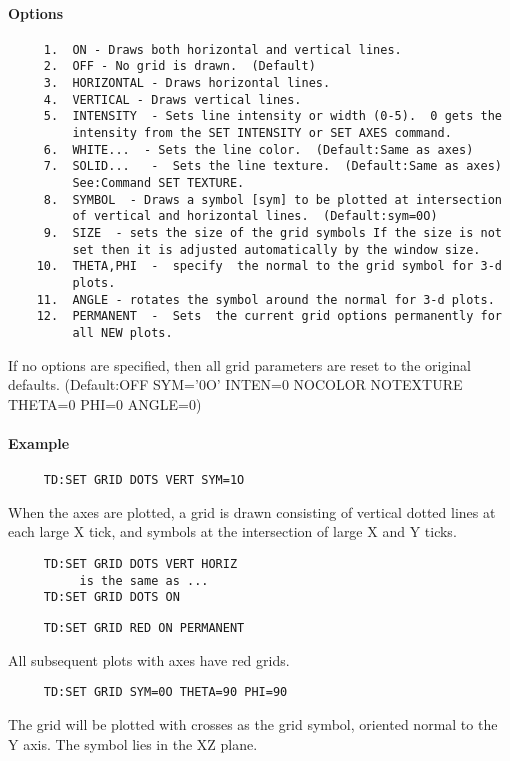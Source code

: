 \paragraph{Options}

\begin{verbatim}
     1.  ON - Draws both horizontal and vertical lines.  
     2.  OFF - No grid is drawn.  (Default) 
     3.  HORIZONTAL - Draws horizontal lines.  
     4.  VERTICAL - Draws vertical lines.  
     5.  INTENSITY  - Sets line intensity or width (0-5).  0 gets the
         intensity from the SET INTENSITY or SET AXES command.  
     6.  WHITE...  - Sets the line color.  (Default:Same as axes) 
     7.  SOLID...   -  Sets the line texture.  (Default:Same as axes)
         See:Command SET TEXTURE.  
     8.  SYMBOL  - Draws a symbol [sym] to be plotted at intersection
         of vertical and horizontal lines.  (Default:sym=0O) 
     9.  SIZE  - sets the size of the grid symbols If the size is not
         set then it is adjusted automatically by the window size.  
    10.  THETA,PHI  -  specify  the normal to the grid symbol for 3-d
         plots.  
    11.  ANGLE - rotates the symbol around the normal for 3-d plots. 
    12.  PERMANENT  -  Sets  the current grid options permanently for
         all NEW plots.  
\end{verbatim}
If  no  options  are specified, then all grid parameters are reset to
the  original  defaults.   (Default:OFF  SYM='0O'   INTEN=0   NOCOLOR
NOTEXTURE THETA=0 PHI=0 ANGLE=0) 
\paragraph{Example}
\begin{verbatim}
     TD:SET GRID DOTS VERT SYM=1O 
\end{verbatim}
When  the  axes  are  plotted, a grid is drawn consisting of vertical
dotted lines at each large X tick, and symbols at the intersection of
large X and Y ticks.  
\begin{verbatim}
     TD:SET GRID DOTS VERT HORIZ 
          is the same as ...  
     TD:SET GRID DOTS ON 
\end{verbatim}

\begin{verbatim}
     TD:SET GRID RED ON PERMANENT 
\end{verbatim}
All subsequent plots with axes have red grids.  

\begin{verbatim}
     TD:SET GRID SYM=0O THETA=90 PHI=90 
\end{verbatim}
The  grid  will  be plotted with crosses as the grid symbol, oriented
normal to the Y axis.  The symbol lies in the XZ plane.  
